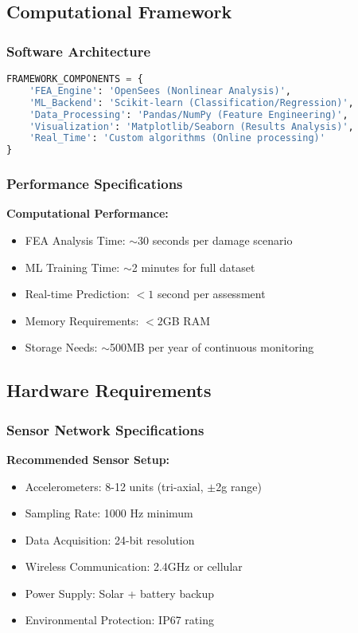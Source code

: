 \documentclass[12pt,a4paper]{article}
\begin{document}
\subsection{Computational Framework}

\subsubsection{Software Architecture}

\begin{lstlisting}[language=Python, caption=Framework Components]
FRAMEWORK_COMPONENTS = {
    'FEA_Engine': 'OpenSees (Nonlinear Analysis)',
    'ML_Backend': 'Scikit-learn (Classification/Regression)',
    'Data_Processing': 'Pandas/NumPy (Feature Engineering)',
    'Visualization': 'Matplotlib/Seaborn (Results Analysis)',
    'Real_Time': 'Custom algorithms (Online processing)'
}
\end{lstlisting}

\subsubsection{Performance Specifications}

\textbf{Computational Performance:}
\begin{itemize}
    \item FEA Analysis Time: $\sim$30 seconds per damage scenario
    \item ML Training Time: $\sim$2 minutes for full dataset
    \item Real-time Prediction: $<1$ second per assessment
    \item Memory Requirements: $<2$GB RAM
    \item Storage Needs: $\sim$500MB per year of continuous monitoring
\end{itemize}

\subsection{Hardware Requirements}

\subsubsection{Sensor Network Specifications}

\textbf{Recommended Sensor Setup:}
\begin{itemize}
    \item Accelerometers: 8-12 units (tri-axial, $\pm$2g range)
    \item Sampling Rate: 1000 Hz minimum
    \item Data Acquisition: 24-bit resolution
    \item Wireless Communication: 2.4GHz or cellular
    \item Power Supply: Solar + battery backup
    \item Environmental Protection: IP67 rating
\end{itemize}
\end{document}
